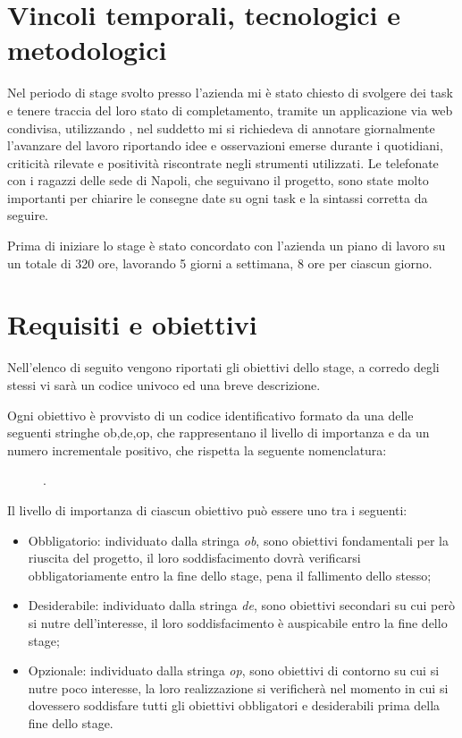 \section{Vincoli temporali, tecnologici e metodologici}
Nel periodo di stage svolto presso l'azienda mi è stato chiesto di svolgere dei task e tenere traccia del loro stato di completamento, tramite un applicazione via web condivisa, utilizzando , nel suddetto mi si richiedeva di annotare giornalmente l'avanzare del lavoro riportando idee e osservazioni emerse durante i  quotidiani, criticità rilevate e positività riscontrate negli strumenti utilizzati.
Le telefonate con i ragazzi delle sede di Napoli, che seguivano il progetto, sono state molto importanti per chiarire le consegne date su ogni task e la sintassi corretta da seguire.

Prima di iniziare lo stage è stato concordato con l'azienda un piano di lavoro su un totale di 320 ore, lavorando 5 giorni a settimana, 8 ore per ciascun giorno. 

\section{Requisiti e obiettivi}
Nell'elenco di seguito vengono riportati gli obiettivi dello stage, a corredo degli stessi vi sarà un codice univoco ed una breve descrizione.

Ogni obiettivo è provvisto di un codice identificativo formato da una delle seguenti stringhe ob,de,op, che rappresentano il livello di importanza e da un numero incrementale positivo, che rispetta la seguente nomenclatura: 
\begin{figure}[htp]
	\centering
	[importanza][identificativo].
\end{figure}

Il livello di importanza di ciascun obiettivo può essere uno tra i seguenti:
\begin{itemize}
	\item Obbligatorio: individuato dalla stringa \textit{ob}, sono obiettivi fondamentali per la riuscita del progetto, il loro soddisfacimento dovrà verificarsi obbligatoriamente entro la fine dello stage, pena il fallimento dello stesso;
	\item Desiderabile: individuato dalla stringa \textit{de}, sono obiettivi secondari su cui però si nutre dell'interesse, il loro soddisfacimento è auspicabile entro la fine dello stage;
	\item Opzionale: individuato dalla stringa \textit{op}, sono obiettivi di contorno su cui si nutre poco interesse, la loro realizzazione si verificherà nel momento in cui si dovessero soddisfare tutti gli obiettivi obbligatori e desiderabili prima della fine dello stage.
\end{itemize}


